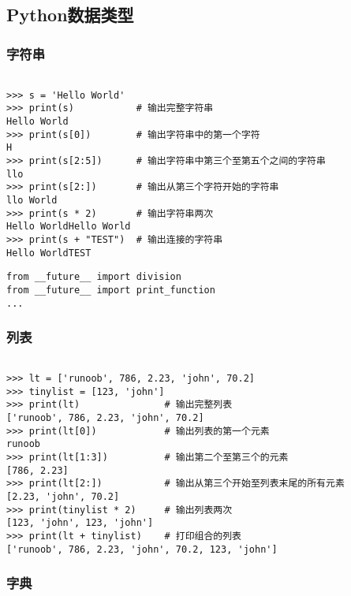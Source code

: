 \subsection{Python数据类型}

\subsubsection{字符串}

\begin{verbatim}

>>> s = 'Hello World'
>>> print(s)           # 输出完整字符串
Hello World
>>> print(s[0])        # 输出字符串中的第一个字符
H
>>> print(s[2:5])      # 输出字符串中第三个至第五个之间的字符串
llo
>>> print(s[2:])       # 输出从第三个字符开始的字符串
llo World
>>> print(s * 2)       # 输出字符串两次
Hello WorldHello World
>>> print(s + "TEST")  # 输出连接的字符串
Hello WorldTEST
\end{verbatim}

\begin{verbatim}
from __future__ import division
from __future__ import print_function
...
\end{verbatim}

\subsubsection{列表}

\begin{verbatim}

>>> lt = ['runoob', 786, 2.23, 'john', 70.2]
>>> tinylist = [123, 'john']
>>> print(lt)               # 输出完整列表
['runoob', 786, 2.23, 'john', 70.2]
>>> print(lt[0])            # 输出列表的第一个元素
runoob
>>> print(lt[1:3])          # 输出第二个至第三个的元素 
[786, 2.23]
>>> print(lt[2:])           # 输出从第三个开始至列表末尾的所有元素
[2.23, 'john', 70.2]
>>> print(tinylist * 2)     # 输出列表两次
[123, 'john', 123, 'john']
>>> print(lt + tinylist)    # 打印组合的列表
['runoob', 786, 2.23, 'john', 70.2, 123, 'john']
\end{verbatim}

\subsubsection{字典}

